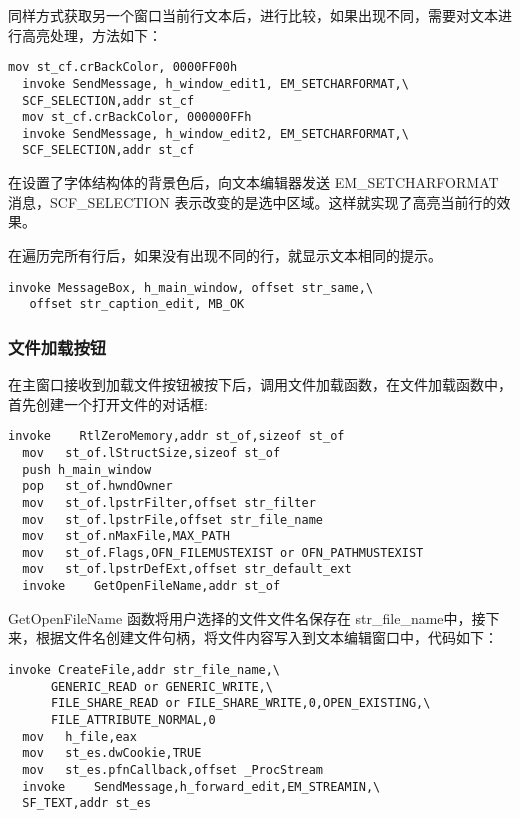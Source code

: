 \documentclass[proposal-report]{bitart}
\begin{document}
同样方式获取另一个窗口当前行文本后，进行比较，如果出现不同，需要对文本进行高亮处理，方法如下：

\begin{lstlisting}[language={[x86masm]Assembler}]
  mov st_cf.crBackColor, 0000FF00h
  invoke SendMessage, h_window_edit1, EM_SETCHARFORMAT,\
  SCF_SELECTION,addr st_cf
  mov st_cf.crBackColor, 000000FFh
  invoke SendMessage, h_window_edit2, EM_SETCHARFORMAT,\
  SCF_SELECTION,addr st_cf
\end{lstlisting}

在设置了字体结构体的背景色后，向文本编辑器发送 EM\_SETCHARFORMAT 消息，SCF\_SELECTION 表示改变的是选中区域。这样就实现了高亮当前行的效果。

在遍历完所有行后，如果没有出现不同的行，就显示文本相同的提示。

\begin{lstlisting}[language={[x86masm]Assembler}]
  invoke MessageBox, h_main_window, offset str_same,\
   offset str_caption_edit, MB_OK
\end{lstlisting}

\subsubsection{文件加载按钮}

在主窗口接收到加载文件按钮被按下后，调用文件加载函数，在文件加载函数中，首先创建一个打开文件的对话框:

\begin{lstlisting}[language={[x86masm]Assembler}]
  invoke	RtlZeroMemory,addr st_of,sizeof st_of
  mov	st_of.lStructSize,sizeof st_of
  push h_main_window
  pop	st_of.hwndOwner
  mov	st_of.lpstrFilter,offset str_filter
  mov	st_of.lpstrFile,offset str_file_name
  mov	st_of.nMaxFile,MAX_PATH
  mov	st_of.Flags,OFN_FILEMUSTEXIST or OFN_PATHMUSTEXIST
  mov	st_of.lpstrDefExt,offset str_default_ext
  invoke	GetOpenFileName,addr st_of
\end{lstlisting}

GetOpenFileName 函数将用户选择的文件文件名保存在 str\_file\_name中，接下来，根据文件名创建文件句柄，将文件内容写入到文本编辑窗口中，代码如下：

\begin{lstlisting}[language={[x86masm]Assembler}]
  invoke CreateFile,addr str_file_name,\
      GENERIC_READ or GENERIC_WRITE,\
      FILE_SHARE_READ or FILE_SHARE_WRITE,0,OPEN_EXISTING,\
      FILE_ATTRIBUTE_NORMAL,0
  mov	h_file,eax
  mov	st_es.dwCookie,TRUE
  mov	st_es.pfnCallback,offset _ProcStream
  invoke	SendMessage,h_forward_edit,EM_STREAMIN,\
  SF_TEXT,addr st_es
\end{lstlisting}
\end{document}
